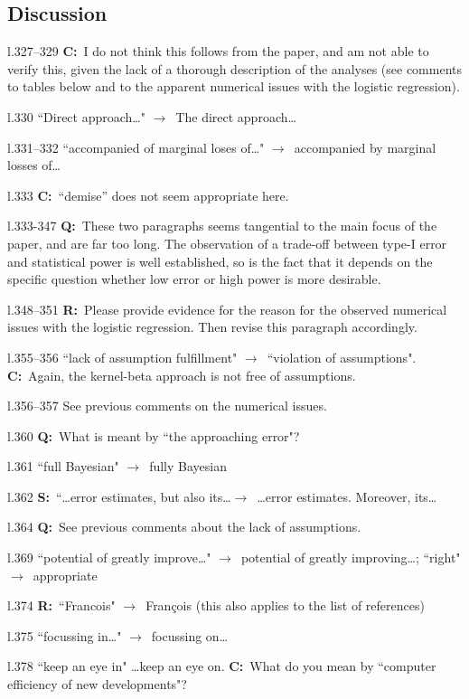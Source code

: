 \documentclass[11pt]{article}
\newenvironment{my_description}
{\begin{description}
  \setlength{\itemsep}{2pt}
  \setlength{\parskip}{0pt}
  \setlength{\parsep}{0pt}}
{\end{description}}
\newcommand{\ra}{$\rightarrow$\ }
\newcommand{\C}{\textbf{C:}\ }
\newcommand{\Q}{\textbf{Q:}\ }
\newcommand{\R}{\textbf{R:}\ }
\newcommand{\V}{\textbf{S:}\ }
\begin{document}
\subsection{Discussion}
\begin{my_description}
	\item[l.327--329] \C I do not think this follows from the paper, and am not able to verify this, given the lack of a thorough description of the analyses (see comments to tables below and to the apparent numerical issues with the logistic regression).
	\item[l.330] ``Direct approach\dots" \ra The direct approach\dots
	\item[l.331--332] ``accompanied of marginal loses of\dots" \ra accompanied by marginal losses of\dots
	\item[l.333] \C ``demise'' does not seem appropriate here.
	\item[l.333-347] \Q These two paragraphs seems tangential to the main focus of the paper, and are far too long. The observation of a trade-off between type-I error and statistical power is well established, so is the fact that it depends on the specific question whether low error or high power is more desirable.
	\item[l.348--351] \R Please provide evidence for the reason for the observed numerical issues with the logistic regression. Then revise this paragraph accordingly.
	\item[l.355--356] ``lack of assumption fulfillment" \ra ``violation of assumptions". \C Again, the kernel-beta approach is not free of assumptions.
	\item[l.356--357] See previous comments on the numerical issues.
	\item[l.360] \Q What is meant by ``the approaching error"?
	\item[l.361] ``full Bayesian" \ra fully Bayesian
	\item[l.362] \V ``\dots error estimates, but also its\dots \ra \dots error estimates. Moreover, its\dots
	\item[l.364] \Q See previous comments about the lack of assumptions.
	\item[l.369] ``potential of greatly improve\dots" \ra potential of greatly improving\dots; ``right" \ra appropriate
	\item[l.374] \R ``Francois" \ra Fran\c{c}ois (this also applies to the list of references)
	\item[l.375] ``focussing in\dots" \ra focussing on\dots
	\item[l.378] ``keep an eye in" \dots keep an eye on. \C What do you mean by ``computer efficiency of new developments"?
\end{my_description}
	
\end{document}
